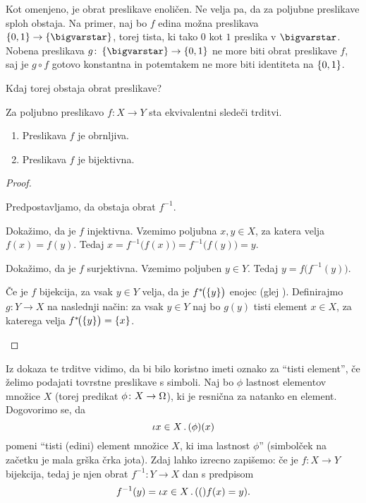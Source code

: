 Kot omenjeno, je obrat preslikave enoličen. Ne velja pa, da za poljubne preslikave sploh obstaja. Na primer, naj bo $f$ edina možna preslikava $\set{0, 1} \to \set{\unit}$, torej tista, ki tako $0$ kot $1$ preslika v $\unit$. Nobena preslikava $g\colon \set{\unit} \to \set{0, 1}$ ne more biti obrat preslikave $f$, saj je $g \circ f$ gotovo konstantna in potemtakem ne more biti identiteta na $\set{0, 1}$.

Kdaj torej obstaja obrat preslikave?

\begin{trditev}
Za poljubno preslikavo $f\colon X \to Y$ sta ekvivalentni sledeči trditvi.
\begin{enumerate}
\item
Preslikava $f$ je obrnljiva.
\item
Preslikava $f$ je bijektivna.
\end{enumerate}
\end{trditev}

\begin{proof}
\begin{implproof}{1}{2}
Predpostavljamo, da obstaja obrat $f^{-1}$.

Dokažimo, da je $f$ injektivna. Vzemimo poljubna $x, y \in X$, za katera velja $f(x) = f(y)$. Tedaj $x = f^{-1}\big(f(x)\big) = f^{-1}\big(f(y)\big) = y$.

Dokažimo, da je $f$ surjektivna. Vzemimo poljuben $y \in Y$. Tedaj $y = f\big(f^{-1}(y)\big)$.
\end{implproof}
\begin{implproof}{2}{1}
Če je $f$ bijekcija, za vsak $y \in Y$ velja, da je $\pim[1]{f}{\set{y}}$ enojec (glej ). Definirajmo $g\colon Y \to X$ na naslednji način: za vsak $y \in Y$ naj bo $g(y)$ tisti element $x \in X$, za katerega velja $\pim[1]{f}{\set{y}} = \set{x}$. 
\end{implproof}
\end{proof}

Iz dokaza te trditve vidimo, da bi bilo koristno imeti oznako za ``tisti element'', če želimo podajati tovrstne preslikave s simboli. Naj bo $\phi$ lastnost elementov množice $X$ (torej predikat $\phi\colon X \to \Omega$), ki je resnična za natanko en element. Dogovorimo se, da
\[\that{x \in X} \phi(x)\]
pomeni ``tisti (edini) element množice $X$, ki ima lastnost $\phi$'' (simbolček na začetku je mala grška črka jota). Zdaj lahko izrecno zapišemo: če je $f\colon X \to Y$ bijekcija, tedaj je njen obrat $f^{-1}\colon Y \to X$ dan s predpisom
\[f^{-1}(y) = \that{x \in X} (f(x) = y).\]

